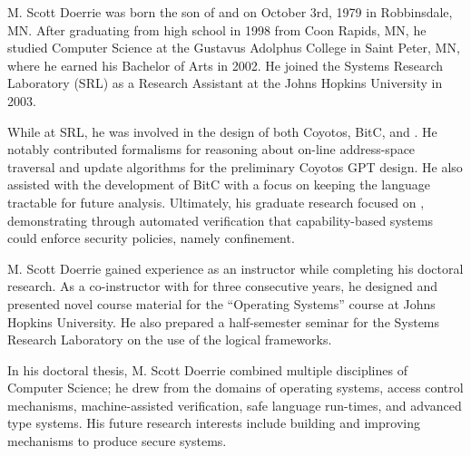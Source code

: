 \begin{vita}
  
  M. Scott Doerrie was born the son of \PERSONmom{} and \PERSONdad{} on October 3rd, 1979 in Robbinsdale, MN.
  After graduating from high school in 1998 from Coon Rapids, MN, he studied Computer Science at the Gustavus Adolphus College in Saint Peter, MN, where he earned his Bachelor of Arts in 2002.
  He joined the Systems Research Laboratory (SRL) as a Research Assistant at the Johns Hopkins University in 2003.

  While at SRL, he was involved in the design of both Coyotos, BitC, and \TMmodelName{}.
  He notably contributed formalisms for reasoning about on-line address-space traversal and update algorithms for the preliminary Coyotos GPT design.
  He also assisted with the development of BitC with a focus on keeping the language tractable for future analysis.
  Ultimately, his graduate research focused on \TMmodelName{}, demonstrating through automated verification that capability-based systems could enforce security policies, namely confinement.
  
  M. Scott Doerrie gained experience as an instructor while completing his doctoral research.
  As a co-instructor with \PERSONswaroop{} for three consecutive years, he designed and presented novel course material for the ``Operating Systems'' course at Johns Hopkins University.
  He also prepared a half-semester seminar for the Systems Research Laboratory on the use of the logical frameworks.

  In his doctoral thesis, M. Scott Doerrie combined multiple disciplines of Computer Science; he drew from the domains of operating systems, access control mechanisms, machine-assisted verification, safe language run-times, and advanced type systems.
  His future research interests include building and improving mechanisms to produce secure systems.
  
\end{vita}
